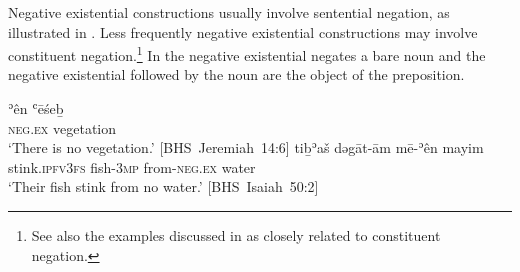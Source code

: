 ﻿\documentclass[output=paper]{langsci/langscibook}
\begin{document}
Negative existential constructions usually involve sentential negation, as
illustrated in . %
%
Less frequently negative existential constructions may involve constituent
negation.\footnote{See also the examples discussed in \textcite[803,
§2.5]{NaudeRendsburg2013} as closely related to constituent negation.} In
 the negative existential negates a bare noun and the negative existential followed by the noun are the object of the preposition.
%
\begin{exe}\ex\label{ex:heb-vegetation-stink}
\begin{xlist}
\ex\label{ex:heb-vegetation}
\gll ʾên  ʿēśeḇ\\
    \textsc{neg.ex} vegetation\\
\glt `There is no vegetation.' \mbox{[BHS Jeremiah
14:6]}
\ex\label{ex:heb-stink}
\gll tiḇʾaš dəgāt-ām mē-ʾên mayim\\
stink.\textsc{ipfv3fs} fish-\textsc{3mp}  from-\textsc{neg.ex} water\\
\glt `Their fish stink from no water.' \mbox{[BHS
Isaiah 50:2]}
\end{xlist}
\end{exe}
%
\end{document}
